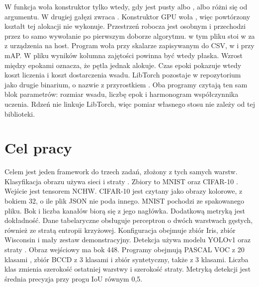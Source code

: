 W  funkcja  woła konstruktor tylko wtedy, gdy  jest pusty albo ,  albo  różni się od argumentu. W drugiej gałęzi zwraca . Konstruktor GPU woła , więc powtórzony kształt tej alokacji nie wykonuje. Przestrzeń robocza  jest osobnym  i przechodzi przez to samo wywołanie po pierwszym doborze algorytmu.  w tym pliku stoi w  za  z urządzenia na host. Program woła  przy skalarze zapisywanym do CSV, w  i przy mAP. W pliku wyników kolumna zajętości powinna być wtedy płaska. Wzrost między epokami oznacza, że pętla jednak alokuje. Czas epoki pokazuje wtedy koszt liczenia i koszt dostarczenia wsadu. LibTorch pozostaje w repozytorium jako drugie binarium, o nazwie z przyrostkiem . Oba programy czytają ten sam blok parametrów: rozmiar wsadu, liczbę epok i harmonogram współczynnika uczenia. Rdzeń  nie linkuje LibTorch, więc pomiar własnego stosu nie zależy od tej biblioteki.

\section{Cel pracy}

Celem jest jeden framework do trzech zadań, złożony z tych samych warstw. Klasyfikacja obrazu używa sieci  i straty . Zbiory to MNIST oraz CIFAR-10 \cite{lecun1998mnist,krizhevsky2009cifar}. Wejście jest tensorem NCHW. CIFAR-10 jest czytany jako obrazy kolorowe, z bokiem 32, o ile plik JSON nie poda innego. MNIST pochodzi ze spakowanego pliku. Bok i liczba kanałów biorą się z jego nagłówka. Dodatkową metryką jest dokładność. Dane tabelaryczne obsługuje perceptron o dwóch warstwach gęstych, również ze stratą entropii krzyżowej. Konfiguracja obejmuje zbiór Iris, zbiór Wisconsin i mały zestaw demonstracyjny. Detekcja używa modelu YOLOv1 \cite{redmon2016yolo} oraz straty . Obraz wejściowy ma bok 448. Programy obejmują PASCAL VOC z 20 klasami \cite{everingham2010voc}, zbiór BCCD z 3 klasami i zbiór syntetyczny, także z 3 klasami. Liczba klas zmienia szerokość ostatniej warstwy i szerokość straty. Metryką detekcji jest średnia precyzja przy progu IoU równym 0,5.

